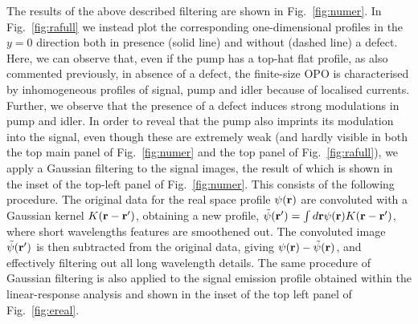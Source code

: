 \begin{subappendices}
The results of the above described filtering are shown in
Fig.~\ref{fig:numer}.
%
In Fig.~\ref{fig:rafull} we instead plot the corresponding
one-dimensional profiles in the $y=0$ direction both in presence
(solid line) and without (dashed line) a defect. Here, we can observe
that, even if the pump has a top-hat flat profile, as also commented
previously, in absence of a defect, the finite-size OPO is
characterised by inhomogeneous profiles of signal, pump and idler
because of localised currents. Further, we observe that the presence
of a defect induces strong modulations in pump and idler.
%
In order to reveal that the pump also imprints its modulation into the
signal, even though these are extremely weak (and hardly visible in
both the top main panel of Fig.~\ref{fig:numer} and the top panel of
Fig.~\ref{fig:rafull}), we apply a Gaussian filtering to the signal
images, the result of which is shown in the inset of the top-left
panel of Fig.~\ref{fig:numer}.
%
This consists of the following procedure. The original data for the
real space profile $\psi(\mathbf{r})$ are convoluted with a Gaussian
kernel $K(\mathbf{r} - \mathbf{r}')$, obtaining a new profile,
$\tilde{\psi}(\mathbf{r}') = \int d\mathbf{r} \psi (\mathbf{r}) K(\mathbf{r} -
\mathbf{r}')$, where short wavelengths features are smoothened out. The
convoluted image $\tilde{\psi}(\mathbf{r}')$ is then subtracted from the
original data, giving $\psi(\mathbf{r}) - \tilde{\psi}(\mathbf{r})$, and
effectively filtering out all long wavelength details.
%
The same procedure of Gaussian filtering is also applied to the signal
emission profile obtained within the linear-response analysis and
shown in the inset of the top left panel of Fig.~\ref{fig:ereal}.


\end{subappendices}
